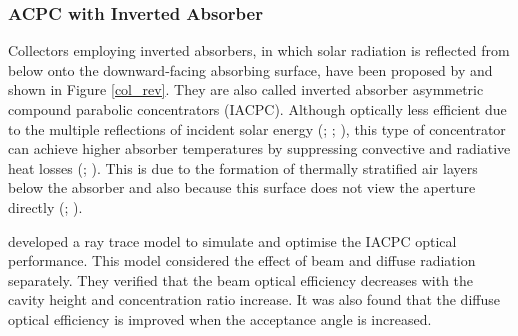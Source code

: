 
\subsubsection{ACPC with Inverted Absorber}

Collectors employing inverted absorbers, in which solar radiation is reflected from below onto the downward-facing absorbing surface, have been proposed by \citet{Rabl1976} and shown in Figure \ref{col_rev}. They are also called inverted absorber asymmetric compound parabolic concentrators (IACPC). Although optically less efficient due to the multiple reflections of incident solar energy (\cite{Eames1996}; \cite{Kothdiwala1996}; \cite{Shams2013}), this type of concentrator can achieve higher absorber temperatures by suppressing convective and radiative heat losses (\cite{Kothdiwala1997}; \cite{Kothdiwala1999}). This is due to the formation of thermally stratified air layers below the absorber and also because this surface does not view the aperture directly (\cite{Kienzlen1988}; \cite{Eames2001}).


\citet{Kothdiwala1996} developed a ray trace model to simulate and optimise the IACPC optical performance. This model considered the effect of beam and diffuse radiation separately. They verified that the beam optical efficiency decreases with the cavity height and concentration ratio increase. It was also found that the diffuse optical efficiency is improved when the acceptance angle is increased.


